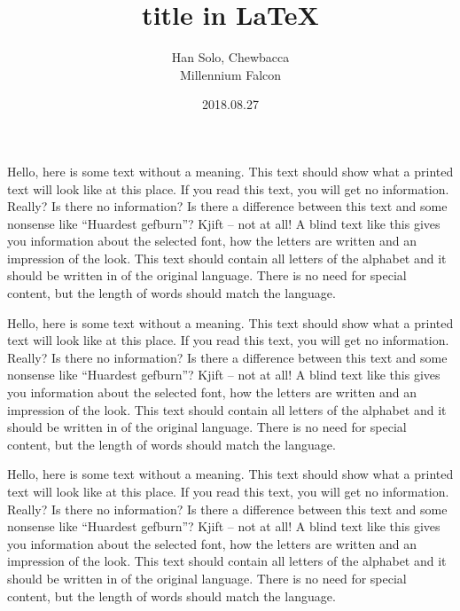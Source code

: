 \documentclass[a4paper, 12pt]{article}
\title{title in \LaTeX}
\author{Han Solo, Chewbacca \\Millennium Falcon}
\date{2018.08.27}         %
\begin{document}
\maketitle

\begin{multicols}{2}   %
  
  Hello, here is some text without a meaning. This text should show what a printed text will look like at this place. If you read this text, you will get no information. Really? Is there no information? Is there a difference between this text and some nonsense like “Huardest gefburn”? Kjift – not at all! A blind text like this gives you information about the selected font, how the letters are written and an impression of the look. This text should contain all letters of the alphabet and it should be written in of the original language. There is no need for special content, but the length of words should match the language.
  
  Hello, here is some text without a meaning. This text should show what a printed text will look like at this place. If you read this text, you will get no information. Really? Is there no information? Is there a difference between this text and some nonsense like “Huardest gefburn”? Kjift – not at all! A blind text like this gives you information about the selected font, how the letters are written and an impression of the look. This text should contain all letters of the alphabet and it should be written in of the original language. There is no need for special content, but the length of words should match the language.
  
  Hello, here is some text without a meaning. This text should show what a printed text will look like at this place. If you read this text, you will get no information. Really? Is there no information? Is there a difference between this text and some nonsense like “Huardest gefburn”? Kjift – not at all! A blind text like this gives you information about the selected font, how the letters are written and an impression of the look. This text should contain all letters of the alphabet and it should be written in of the original language. There is no need for special content, but the length of words should match the language.
  \end{multicols}
  
\end{document}
